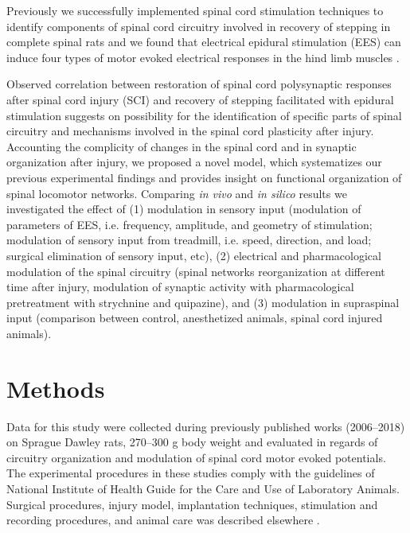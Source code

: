 \documentclass[]{elsarticle}
\begin{document}
Previously we successfully implemented spinal cord stimulation techniques to identify components of spinal cord circuitry involved in recovery of stepping in complete spinal rats and we found that electrical epidural stimulation (EES) can induce four types of motor evoked electrical responses in the hind limb muscles \cite{gerasimenko2006spinal,lavrov_plasticity_2006}.

Observed correlation between restoration of spinal cord polysynaptic responses after spinal cord injury (SCI) and recovery of stepping facilitated with epidural stimulation \cite{lavrov2008,lavrov_plasticity_2006} suggests on possibility for the identification of specific parts of spinal circuitry and mechanisms involved in the spinal cord plasticity after injury. Accounting the complicity of changes in the spinal cord and in synaptic organization after injury, we proposed a novel model, which systematizes our previous experimental findings and provides insight on functional organization of spinal locomotor networks. Comparing \emph{in vivo} and \emph{in silico} results we investigated the effect of (1) modulation in sensory input (modulation of parameters of EES, i.e. frequency, amplitude, and geometry of stimulation; modulation of sensory input from treadmill, i.e. speed, direction, and load; surgical elimination of sensory input, etc), (2) electrical and pharmacological modulation of the spinal circuitry (spinal networks reorganization at different time after injury, modulation of synaptic activity with pharmacological pretreatment with strychnine and quipazine), and (3) modulation in supraspinal input (comparison between control, anesthetized animals, spinal cord injured animals).

\section{Methods} 

Data for this study were collected during previously published works (2006--2018) on Sprague Dawley rats, 270--300 g body weight and evaluated in regards of circuitry organization and modulation of spinal cord motor evoked potentials. The experimental procedures in these studies comply with the guidelines of National Institute of Health Guide for the Care and Use of Laboratory Animals. Surgical procedures, injury model, implantation techniques, stimulation and recording procedures, and animal care was described elsewhere \cite{roy1991emg,talmadge2002mechanical,ichiyama2005hindlimb,lavrov_plasticity_2006,lavrov2008}.
\end{document}
